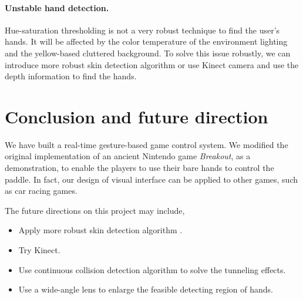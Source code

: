 \documentclass[10pt,twocolumn,letterpaper]{article}
\begin{document}
\paragraph{Unstable hand detection.}
Hue-saturation thresholding is not a very robust 
technique to find the user's hands. It will 
be affected by the color temperature of the environment lighting 
and the yellow-based cluttered background. 
To solve this issue robustly, we can introduce 
more robust skin detection algorithm \cite{betterskin} or 
use Kinect camera and use the depth information to find the hands.


\section{Conclusion and future direction}
We have built a real-time gesture-based game control system. 
We modified the original implementation of an ancient Nintendo game \emph{Breakout}, as a demonstration, 
to enable the players to use their bare hands to control the paddle. 
In fact, our design of visual interface can be applied to other games, 
such as car racing games. 

The future directions on this project may include, 
\begin{itemize}
	\item Apply more robust skin detection algorithm \cite{betterskin}.
	\item Try Kinect.
	\item Use continuous collision detection algorithm to solve the tunneling effects.
	\item Use a wide-angle lens to enlarge the feasible detecting region of hands.
\end{itemize}

{\small


}
\end{document}
